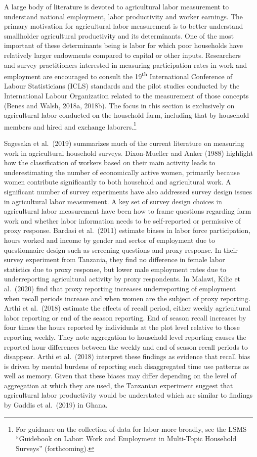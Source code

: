 \documentclass[
]{book}
\begin{document}
A large body of literature is devoted to agricultural labor measurement to understand national employment, labor productivity and worker earnings. The primary motivation for agricultural labor measurement is to better understand smallholder agricultural productivity and its determinants. One of the most important of these determinants being is labor for which poor households have relatively larger endowments compared to capital or other inputs. Researchers and survey practitioners interested in measuring participation rates in work and employment are encouraged to consult the 19\textsuperscript{th} International Conference of Labour Statisticians (ICLS) standards and the pilot studies conducted by the International Labour Organization related to the measurement of those concepts (Benes and Walsh, 2018a, 2018b). The focus in this section is exclusively on agricultural labor conducted on the household farm, including that by household members and hired and exchange laborers.\footnote{For guidance on the collection of data for labor more broadly, see the LSMS ``Guidebook on Labor: Work and Employment in Multi-Topic Household Surveys'' (forthcoming).}

Sagesaka et al.~(2019) summarizes much of the current literature on measuring work in agricultural household surveys. Dixon-Mueller and Anker (1988) highlight how the classification of workers based on their main activity leads to underestimating the number of economically active women, primarily because women contribute significantly to both household and agricultural work. A significant number of survey experiments have also addressed survey design issues in agricultural labor measurement. A key set of survey design choices in agricultural labor measurement have been how to frame questions regarding farm work and whether labor information needs to be self-reported or permissive of proxy response. Bardasi et al.~(2011) estimate biases in labor force participation, hours worked and income by gender and sector of employment due to questionnaire design such as screening questions and proxy response. In their survey experiment from Tanzania, they find no difference in female labor statistics due to proxy response, but lower male employment rates due to underreporting agricultural activity by proxy respondents. In Malawi, Kilic et al.~(2020) find that proxy reporting increases underreporting of employment when recall periods increase and when women are the subject of proxy reporting. Arthi et al.~(2018) estimate the effects of recall period, either weekly agricultural labor reporting or end of the season reporting. End of season recall increases by four times the hours reported by individuals at the plot level relative to those reporting weekly. They note aggregation to household level reporting causes the reported hour differences between the weekly and end of season recall periods to disappear. Arthi et al.~(2018) interpret these findings as evidence that recall bias is driven by mental burdens of reporting such disaggregated time use patterns as well as memory. Given that these biases may differ depending on the level of aggregation at which they are used, the Tanzanian experiment suggest that agricultural labor productivity would be understated which are similar to findings by Gaddis et al.~(2019) in Ghana.
\end{document}

